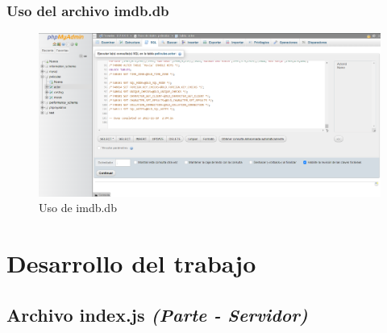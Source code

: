\documentclass{article}
\begin{document}

  \subsubsection{Uso del archivo imdb.db}
  \begin{figure}[H]
    \centering
    \includegraphics[width=1\textwidth, keepaspectratio]{img/crearTablas.png}
    \caption{Uso de imdb.db}
  \end{figure}
  \newpage


  \section{Desarrollo del trabajo}
  

  \subsection{Archivo index.js \textit{(Parte - Servidor)}}
  
\end{document}
